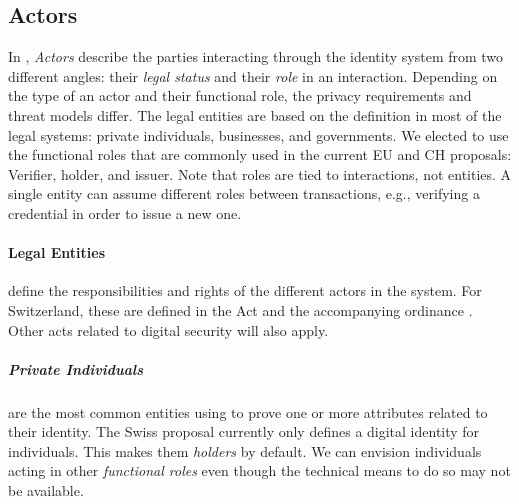 \subsection{Actors}
\label{subsub:actors}

In \emph{\rot}, \emph{Actors} describe the parties interacting through the identity system from two different angles: their \emph{legal status} and their \emph{role} in an interaction.
Depending on the type of an actor and their functional role, the privacy requirements and threat models differ.
The legal entities are based on the definition in most of the legal systems: private individuals, businesses, and governments.
We elected to use the functional roles that are commonly used in the current EU and CH proposals: Verifier, holder, and issuer.
Note that roles are tied to interactions, not entities. 
A single entity can assume different roles between transactions, e.g., verifying a credential in order to issue a new one.


\vspace{1em}


\paragraph{Legal Entities} define the responsibilities and rights of the different actors in the system.
For Switzerland, these are defined in the \eid Act \cite{BGEID24} and the accompanying ordinance \cite{VEID25}.
Other acts related to digital security will also apply.

\subparagraph{Private Individuals}
are the most common entities using \eid to prove one or more attributes related to their identity.
The Swiss proposal currently only defines a digital identity for individuals.
This makes them \emph{holders} by default. We can envision individuals acting in other \emph{functional roles} even though the technical means to do so may not be available.

